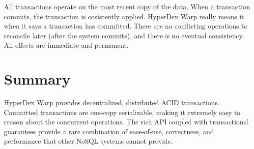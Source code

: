 All transactions operate on the most recent copy of the data.  When a
transaction commits, the transaction is cosistently applied.  HyperDex Warp
really means it when it says a transaction has committed.  There are no
conflicting operations to reconcile later (after the system commits), and there
is no eventual consistency.  All effects are immediate and permanent.

\section{Summary}
\label{sec:transactions:summary}

HyperDex Warp provides decentralized, distributed ACID transactions.  Committed
transactions are one-copy serializable, making it extremely easy to reason about
the concurrent operations.  The rich API coupled with transactional guarantees
provide a rare combination of ease-of-use, correctness, and performance that
other NoSQL systems cannot provide.
